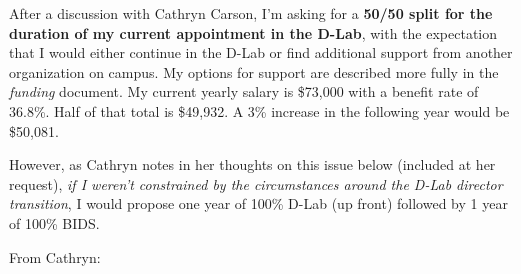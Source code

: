 




After a discussion with Cathryn Carson, I'm asking for a \textbf{50/50 split for
    the duration of my current appointment in the D-Lab}, with the expectation
that I would either continue in the D-Lab or find additional support from
another organization on campus. My options for support are described more fully
in the \emph{funding} document. My current yearly salary is \$73,000 with a
benefit rate of 36.8\%. Half of that total is \$49,932. A 3\% increase
in the following year would be \$50,081.

However, as Cathryn notes in her thoughts on this issue below (included at her
request), \emph{if I weren't constrained by the circumstances around the D-Lab
director transition}, I would propose one year of 100\% D-Lab (up front) followed
by 1 year of 100\% BIDS.

\vspace{2ex}
\noindent
From Cathryn:

